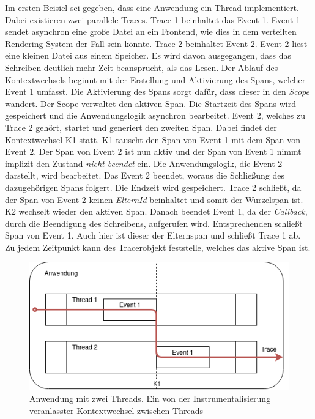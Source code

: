Im ersten Beisiel sei gegeben, dass eine Anwendung ein Thread implementiert. Dabei existieren zwei parallele Traces. Trace 1 beinhaltet das Event 1. Event 1 sendet asynchron eine große Datei an ein Frontend, wie dies in dem verteilten Rendering-System der Fall sein könnte.  Trace 2 beinhaltet Event 2. Event 2 liest eine kleinen Datei aus einem Speicher. Es wird davon ausgegangen, dass das Schreiben deutlich mehr Zeit beansprucht, als das Lesen. Der Ablauf des Kontextwechsels beginnt mit der Erstellung und Aktivierung des Spans, welcher Event 1 umfasst. Die Aktivierung des Spans sorgt dafür, dass dieser in den \emph{Scope} wandert. Der Scope verwaltet den aktiven Span. Die Startzeit des Spans wird gespeichert und die Anwendungslogik asynchron bearbeitet. Event 2, welches zu Trace 2 gehört, startet und generiert den zweiten Span. Dabei findet der Kontextwechsel K1 statt. K1 tauscht den Span von Event 1 mit dem Span von Event 2. Der Span von Event 2 ist nun aktiv und der Span von Event 1 nimmt implizit den Zustand \emph{nicht beendet} ein. Die Anwendungslogik, die Event 2 darstellt, wird bearbeitet. Das Event 2 beendet, woraus die Schließung des dazugehörigen Spans folgert. Die Endzeit wird gespeichert. Trace 2 schließt, da der Span von Event 2 keinen \emph{ElternId} beinhaltet und somit der Wurzelspan ist. K2 wechselt wieder den aktiven Span. Danach beendet Event 1, da der \emph{Callback}, durch die Beendigung des Schreibens, aufgerufen wird. Entsprechenden schließt Span von Event 1. Auch hier ist dieser der Elternspan und schließt Trace 1 ab. Zu jedem Zeitpunkt kann des Tracerobjekt feststelle, welches das aktive Span ist.


\begin{figure}[!ht]
	\centering
	\includegraphics[scale=0.5]{img/Design/SpanMultipleThreadKontext.png}
	\caption[Tracingkontexts über mehrere Threads innerhalb einer Anwendung]{Anwendung mit zwei Threads. Ein von der Instrumentalisierung veranlasster Kontextwechsel zwischen Threads}
	\label{fig:SpanMultipleThreadKontext}
\end{figure}

